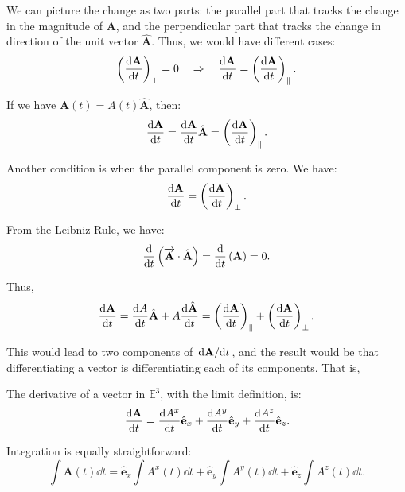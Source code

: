 \documentclass[10pt]{article}
\begin{document}
	We can picture the change as two parts: the parallel part that tracks the change in the magnitude of $\mathbf{A}$, and the perpendicular part that tracks the change in direction of the unit vector $\hat{\mathbf{A}}$. Thus, we would have different cases:
	\begin{equation}
	  \left( \dv{\mathbf{A}}{t} \right)_{\perp} = 0 \quad \Rightarrow \quad \dv{\mathbf{A}}{t} = \left( \dv{\mathbf{A}}{t} \right)_{\parallel}.
	\end{equation}

	If we have $\mathbf{A}(t) = A(t)\hat{\mathbf{A}}$, then:
	\begin{equation}
	  \dv{\mathbf{A}}{t} = \dv{\mathbf{A}}{t}\hat{\mathbf{A}} = \left( \dv{\mathbf{A}}{t} \right)_{\parallel}. 
	\end{equation}

	Another condition is when the parallel component is zero. We have:
	\begin{equation}
	  \dv{\mathbf{A}}{t} = \left( \dv{\mathbf{A}}{t} \right)_{\perp}. 
	\end{equation}

	From the Leibniz Rule, we have:
	\begin{equation}
	  \dv{t} \left( \overrightarrow{\mathbf{A}} \cdot \hat{\mathbf{A}} \right) = \dv{t}   \left( \mathbf{A} \right) = 0.  
	\end{equation}

	Thus,
	\begin{equation}
	  \dv{\mathbf{A}}{t} = \dv{A}{t}\hat{\mathbf{A}} + A \dv{\hat{\mathbf{A}}}{t} = \left( \dv{\mathbf{A}}{t} \right)_{\parallel} + \left( \dv{\mathbf{A}}{t} \right)_{\perp}.  
	\end{equation}
	
	This would lead to two components of $\dv*{\mathbf{A}}{t}$, and the result would be that differentiating a vector is differentiating each of its components. That is,
	\begin{definition}
		The derivative of a vector in $\mathbb{E}^{3}$, with the limit definition, is:
		\begin{equation}
		  \dv{\mathbf{A}}{t} = \dv{A^{x}}{t}\hat{\mathbf{e}}_x + \dv{A^{y}}{t}\hat{\mathbf{e}}_y + \dv{A^{z}}{t}\hat{\mathbf{e}}_z.
		\end{equation}
	\end{definition}

	Integration is equally straightforward:
	\begin{equation}
	  \int \mathbf{A}(t)\dd t = \hat{\mathbf{e}}_x \int A^{x}(t)\dd t + \hat{\mathbf{e}}_y \int A^{y}(t) \dd t + \hat{\mathbf{e}}_z \int A^{z}(t)\dd t.
	\end{equation}
\end{document}
